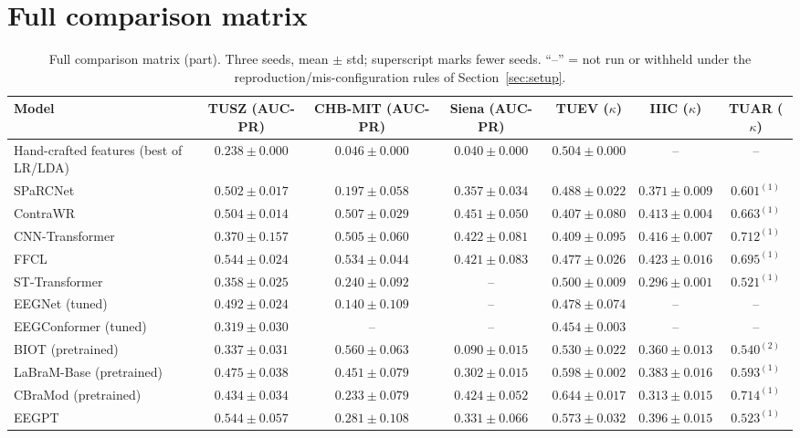 \appendix
\section{Full comparison matrix}
\label{app:matrix}

\begin{table}[h]
\centering
\scriptsize
\caption{Full comparison matrix (part). Three seeds, mean $\pm$ std; superscript marks fewer seeds. ``--'' = not run or withheld under the reproduction/mis-configuration rules of Section~\ref{sec:setup}.}
\begin{tabular}{lcccccc}
\toprule
Model & TUSZ (AUC-PR) & CHB-MIT (AUC-PR) & Siena (AUC-PR) & TUEV ($\kappa$) & IIIC ($\kappa$) & TUAR ($\kappa$) \\
\midrule
Hand-crafted features (best of LR/LDA) & $0.238 \pm 0.000$ & $0.046 \pm 0.000$ & $0.040 \pm 0.000$ & $0.504 \pm 0.000$ & -- & -- \\
SPaRCNet & $0.502 \pm 0.017$ & $0.197 \pm 0.058$ & $0.357 \pm 0.034$ & $0.488 \pm 0.022$ & $0.371 \pm 0.009$ & $0.601^{(1)}$ \\
ContraWR & $0.504 \pm 0.014$ & $0.507 \pm 0.029$ & $0.451 \pm 0.050$ & $0.407 \pm 0.080$ & $0.413 \pm 0.004$ & $0.663^{(1)}$ \\
CNN-Transformer & $0.370 \pm 0.157$ & $0.505 \pm 0.060$ & $0.422 \pm 0.081$ & $0.409 \pm 0.095$ & $0.416 \pm 0.007$ & $0.712^{(1)}$ \\
FFCL & $0.544 \pm 0.024$ & $0.534 \pm 0.044$ & $0.421 \pm 0.083$ & $0.477 \pm 0.026$ & $0.423 \pm 0.016$ & $0.695^{(1)}$ \\
ST-Transformer & $0.358 \pm 0.025$ & $0.240 \pm 0.092$ & -- & $0.500 \pm 0.009$ & $0.296 \pm 0.001$ & $0.521^{(1)}$ \\
EEGNet (tuned) & $0.492 \pm 0.024$ & $0.140 \pm 0.109$ & -- & $0.478 \pm 0.074$ & -- & -- \\
EEGConformer (tuned) & $0.319 \pm 0.030$ & -- & -- & $0.454 \pm 0.003$ & -- & -- \\
BIOT (pretrained) & $0.337 \pm 0.031$ & $0.560 \pm 0.063$ & $0.090 \pm 0.015$ & $0.530 \pm 0.022$ & $0.360 \pm 0.013$ & $0.540^{(2)}$ \\
LaBraM-Base (pretrained) & $0.475 \pm 0.038$ & $0.451 \pm 0.079$ & $0.302 \pm 0.015$ & $0.598 \pm 0.002$ & $0.383 \pm 0.016$ & $0.593^{(1)}$ \\
CBraMod (pretrained) & $0.434 \pm 0.034$ & $0.233 \pm 0.079$ & $0.424 \pm 0.052$ & $0.644 \pm 0.017$ & $0.313 \pm 0.015$ & $0.714^{(1)}$ \\
EEGPT & $0.544 \pm 0.057$ & $0.281 \pm 0.108$ & $0.331 \pm 0.066$ & $0.573 \pm 0.032$ & $0.396 \pm 0.015$ & $0.523^{(1)}$ \\

\end{tabular}
\end{table}

